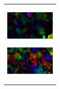 \begin{figure}[htbp]
\begin{tabular}{l}
\begin{minipage}{0.165\hsize}
\begin{center}
          \includegraphics[clip, width=2.5cm]{./Figures/optic_shake4.eps}
          \hspace{0.1cm} { }
        \end{center}
      \end{minipage}
      \begin{minipage}{0.165\hsize}
        \begin{center}
          \includegraphics[clip, width=2.5cm]{./Figures/optic_shake5.eps}
          \hspace{2.2cm} { }
        \end{center}
      \end{minipage}
\\ %


    \end{tabular}
\end{figure}
